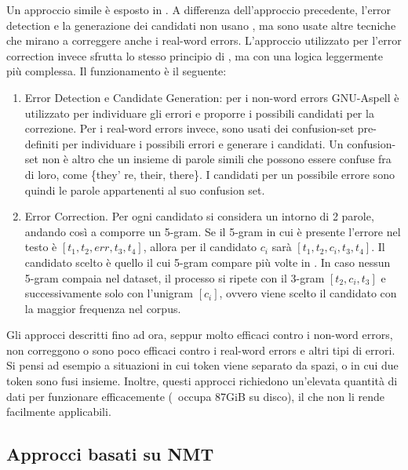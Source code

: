 Un approccio simile è esposto in \cite{ocrG2}. A differenza dell'approccio precedente, l'error detection e la generazione dei candidati non usano \gw, ma sono usate altre tecniche che mirano a correggere anche i real-word errors. L'approccio utilizzato per l'error correction invece sfrutta lo stesso principio di \cite{ocrG1}, ma con una logica leggermente più complessa. Il funzionamento è il seguente:
\begin{enumerate}
\item Error Detection e Candidate Generation: per i non-word errors GNU-Aspell\cite{atkinsongnu} è utilizzato per individuare gli errori e proporre i possibili candidati per la correzione. Per i real-word errors invece, sono usati dei confusion-set pre-definiti per individuare i possibili errori e generare i candidati. Un confusion-set non  è altro che un insieme di parole simili che possono essere confuse fra di loro, come \{they'
re, their, there\}. I candidati per un possibile errore sono quindi le parole appartenenti al suo confusion set.

\item Error Correction. Per ogni candidato si considera un intorno di 2 parole, andando così a comporre un 5-gram. Se il 5-gram in cui è presente l'errore nel testo è $[t_1,t_2,\textit{err},t_3,t_4]$, allora per il candidato $c_i$ sarà $[t_1,t_2,c_i,t_3,t_4]$. Il candidato scelto è quello il cui 5-gram compare più volte in \gw. In caso nessun 5-gram compaia nel dataset, il processo si ripete con il 3-gram $[t_2,c_i,t_3]$ e successivamente solo con l'unigram $[c_i]$, ovvero viene scelto il candidato con la maggior frequenza nel corpus.
\end{enumerate}
Gli approcci descritti fino ad ora, seppur molto efficaci contro i non-word errors, non correggono o sono poco efficaci contro i real-word errors e altri tipi di errori. Si pensi ad esempio a situazioni in cui token viene separato da spazi, o in cui due token sono fusi insieme. Inoltre, questi approcci richiedono un'elevata quantità di dati per funzionare efficacemente (\gw\ occupa 87GiB su disco), il che non li rende facilmente applicabili.


\subsection{Approcci basati su NMT}
\label{sec:arte_nmt}
